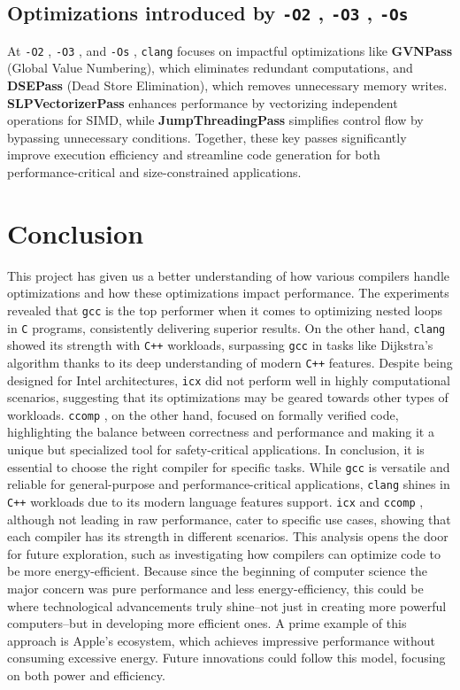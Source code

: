\documentclass{rapport}
\newcommand{\gcc}{\texttt{gcc} }
\newcommand{\icx}{\texttt{icx} }
\newcommand{\clang}{\texttt{clang} }
\newcommand{\comp}{\texttt{ccomp} }
\newcommand{\optitwo}{\texttt{-O2} }
\newcommand{\optithree}{\texttt{-O3} }
\newcommand{\optisize}{\texttt{-Os} }
\begin{document}
\subsection*{Optimizations introduced by \optitwo, \optithree, \optisize}
At \optitwo, \optithree, and \optisize, \clang focuses on impactful optimizations like \textbf{GVNPass} (Global Value Numbering), which eliminates redundant 
computations, and \textbf{DSEPass} (Dead Store Elimination), which removes unnecessary memory writes. \newline
\textbf{SLPVectorizerPass} enhances performance by vectorizing 
independent operations for SIMD, while \textbf{JumpThreadingPass} simplifies control flow by bypassing unnecessary conditions. Together, these key passes 
significantly improve execution efficiency and streamline code generation for both performance-critical and size-constrained applications.

\section*{Conclusion}
This project has given us a better understanding of how various compilers handle optimizations and how these optimizations impact performance. \newline
The experiments revealed that \gcc is the top performer when it comes to optimizing nested loops in \texttt{C} programs, consistently delivering superior results. On the other hand, 
\clang showed its strength with \texttt{C++} workloads, surpassing \gcc in tasks like Dijkstra’s algorithm thanks to its deep understanding of modern \texttt{C++} features.
Despite being designed for Intel architectures, \icx did not perform well in highly computational scenarios, suggesting that its optimizations may be geared towards other types 
of workloads. \comp, on the other hand, focused on formally verified code, highlighting the balance between correctness and performance and making it a unique but specialized tool 
for safety-critical applications.
\newline\newline
In conclusion, it is essential to choose the right compiler for specific tasks. While \gcc is versatile and reliable for general-purpose and performance-critical applications, 
\clang shines in \texttt{C++} workloads due to its modern language features support. \icx and \comp, although not leading in raw performance, cater to specific use cases, showing that 
each compiler has its strength in different scenarios. 
\newline\newline
This analysis opens the door for future exploration, such as investigating how compilers can optimize code to be more energy-efficient. 
Because since the beginning of computer science the major concern was pure performance and less energy-efficiency, this could be where technological advancements truly 
shine--not just in creating more powerful computers--but in developing more efficient ones. 
A prime example of this approach is Apple's ecosystem, which achieves impressive performance without consuming excessive energy. 
Future innovations could follow this model, focusing on both power and efficiency.

\clearpage
\nocite{*}


\end{document}
